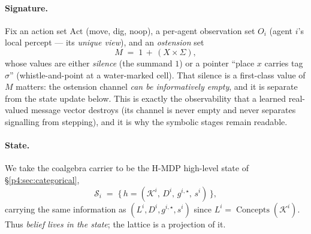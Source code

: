 \documentclass{article}
\begin{document}
\paragraph{Signature.} Fix an action set $\mathrm{Act}$ (move, dig, noop), a
per-agent observation set $O_i$ (agent $i$'s local percept --- its
\emph{unique view}), and an \emph{ostension} set
\[
  M \;=\; 1 \,+\, (X\times\Sigma),
\]
whose values are either \emph{silence} (the summand $1$) or a pointer
``place $x$ carries tag $\sigma$'' (whistle-and-point at a water-marked
cell). That silence is a first-class value of $M$ matters: the ostension
channel \emph{can be informatively empty}, and it is separate from the state
update below. This is exactly the observability that a learned real-valued
message vector destroys (its channel is never empty and never separates
signalling from stepping), and it is why the symbolic stages remain
readable.

\paragraph{State.} We take the coalgebra carrier to be the H-MDP high-level
state of \S\ref{p4:sec:categorical},
\[
  \mathcal{S}_i \;=\; \big\{\, h=(\mathcal{K}^i,\,D^i,\,g^{i,\star},\,s^i) \,\big\},
\]
carrying the same information as $(L^i,D^i,g^{i,\star},s^i)$ since
$L^i=\operatorname{Concepts}(\mathcal K^i)$. Thus \emph{belief lives in the
state}; the lattice is a projection of it.
\end{document}
